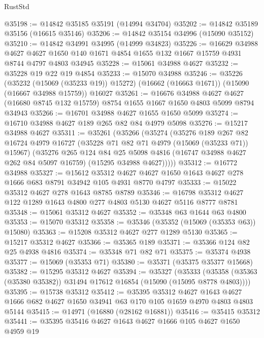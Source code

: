 \begin{lexlean}{RustStd}
\begin{coremodule}
@35198 := @14842 @35185 @35191 (@14994 @34704)
@35202 := @14842 @35189 @35156 (@16615 @35146)
@35206 := @14842 @35154 @34996 (@15090 @35152)
@35210 := @14842 @34991 @34995 (@14999 @34823)
@35226 := @16629
    @34988
    @4627
    @4627
    @1650
    @140
    @1671
    @4854
    @1655
    @132
    @1667
    @15759
    @4931
    @8744
    @4797
    @4803
    @34945
@35228 := @15061 @34988 @4627
@35232 := @35228 @19 @22 @19 @4854
@35233 := @15070 @34988
@35246 := @35226
    (@35232 (@15069 (@35233 @19)) @15272)
    (@16662 (@16663 @1671))
    (@15090 (@16667 @34988 @15759))
    @16027
@35261 := @16676
    @34988
    @4627
    @4627
    (@16680 @8745 @132 @15759)
    @8754
    @1655
    @1667
    @1650
    @4803
    @5099
    @8794
    @34943
@35266 := @16701 @34988 @4627 @1655 @1650 @5099
@35274 := @16710 @34988 @4627 @189 @265 @82 @84 @4979 @5098
@35276 := @15217 @34988 @4627
@35311 := @35261
    (@35266
      (@35274
        (@35276
          @189
          @267
          @82
          @16724
          @4979
          @16727
          (@35228 @71 @82 @71 @4979 (@15069 (@35233 @71)) @15967)
          (@35276
            @265
            @124
            @84
            @25
            @5098
            @4816
            (@16747 @34988 @4627 @262 @84 @5097 @16759)
            (@15295 @34988 @4627)))))
@35312 := @16772 @34988
@35327 := @15612
    @35312
    @4627
    @4627
    @1650
    @1643
    @4627
    @278
    @1666
    @683
    @8791
    @34942
    @105
    @4931
    @8770
    @4797
@35333 := @15022 @35312 @4627 @278 @1643 @8785 @8789
@35346 := @16798 @35312 @4627 @122 @1289 @1643 @4800 @277 @4803 @5130 @4627 @5116 @8777 @8781
@35348 := @15061 @35312 @4627
@35352 := @35348 @63 @1644 @63 @4800
@35353 := @15070 @35312
@35358 := @35346 (@35352 (@15069 (@35353 @63)) @15080)
@35363 := @15208 @35312 @4627 @277 @1289 @5130
@35365 := @15217 @35312 @4627
@35366 := @35365 @189
@35371 := @35366 @124 @82 @25 @4938 @4816
@35374 := @35348 @71 @82 @71
@35375 := @35374 @4938
@35377 := @15069 (@35353 @71)
@35380 := @35371 (@35375 @35377 @15668)
@35382 := @15295 @35312 @4627
@35394 := @35327
    (@35333 (@35358 (@35363 (@35380 @35382)) @31494 @17612 @16854 (@15090 (@15095 @8778 @4803))))
@35395 := @15738 @35312
@35412 := @35395
    @35312
    @4627
    @1643
    @4627
    @1666
    @682
    @4627
    @1650
    @34941
    @63
    @170
    @105
    @1659
    @4970
    @4803
    @4803
    @5144
@35415 := @14971 (@16880 (@28162 @16881))
@35416 := @35415 @35312
@35441 := @35395
    @35416
    @4627
    @1643
    @4627
    @1666
    @105
    @4627
    @1650
    @4959
    @19

\end{coremodule}
\end{lexlean}
